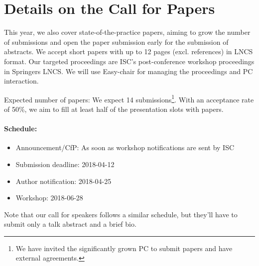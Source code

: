 \documentclass[a4paper,10pt]{article}
\begin{document}
\section{Details on the Call for Papers}

This year, we also cover state-of-the-practice papers, aiming to grow the number of submissions and open the paper submission early for the submission of abstracts.
We accept short papers with up to 12 pages (excl. references) in LNCS format.
Our targeted proceedings are ISC's post-conference workshop proceedings in Springers LNCS.
We will use Easy-chair for managing the proceedings and PC interaction.

Expected number of papers: We expect 14 submissions\footnote{We have invited the significantly grown PC to submit papers and have external agreements.}.
With an acceptance rate of 50\%, we aim to fill at least half of the presentation slots with papers.

\paragraph{Schedule:}
\begin{itemize}
  \item Announcement/CfP: As soon as workshop notifications are sent by ISC
  \item Submission deadline: 2018-04-12
  \item Author notification: 2018-04-25
  \item Workshop: 2018-06-28
\end{itemize}
Note that our call for speakers follows a similar schedule, but they'll have to submit only a talk abstract and a brief bio.
\end{document}
